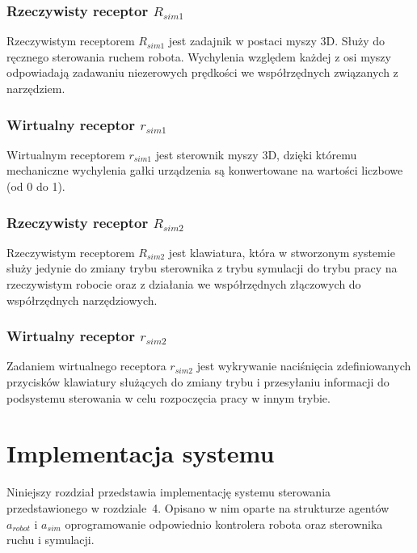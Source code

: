 \documentclass[a4paper, 12pt, twoside]{article}
\begin{document}
\subsubsection{Rzeczywisty receptor $R_{sim1}$}

Rzeczywistym receptorem $R_{sim1}$ jest zadajnik w postaci myszy 3D. Służy do ręcznego sterowania ruchem robota. Wychylenia względem każdej z osi myszy odpowiadają zadawaniu niezerowych prędkości we współrzędnych związanych z narzędziem.

\subsubsection{Wirtualny receptor $r_{sim1}$}

Wirtualnym receptorem $r_{sim1}$ jest sterownik myszy 3D, dzięki któremu mechaniczne wychylenia gałki urządzenia są konwertowane na wartości liczbowe (od 0 do 1).

\subsubsection{Rzeczywisty receptor $R_{sim2}$}

Rzeczywistym receptorem $R_{sim2}$ jest klawiatura, która w stworzonym systemie służy jedynie do zmiany trybu sterownika z trybu symulacji do trybu pracy na rzeczywistym robocie oraz z działania we współrzędnych złączowych do współrzędnych narzędziowych.

\subsubsection{Wirtualny receptor $r_{sim2}$}

Zadaniem wirtualnego receptora $r_{sim2}$ jest wykrywanie naciśnięcia zdefiniowanych przycisków klawiatury służących do zmiany trybu i przesyłaniu informacji do podsystemu sterowania w celu rozpoczęcia pracy w innym trybie.


\newpage
\vspace*{1.5 cm}
\section{Implementacja systemu}
\vspace*{1.5 cm}

Niniejszy rozdział przedstawia implementację systemu sterowania przedstawionego w rozdziale~4. Opisano w nim oparte na strukturze agentów $a_{robot}$ i $a_{sim}$ oprogramowanie odpowiednio kontrolera robota oraz sterownika ruchu i symulacji.
\end{document}
